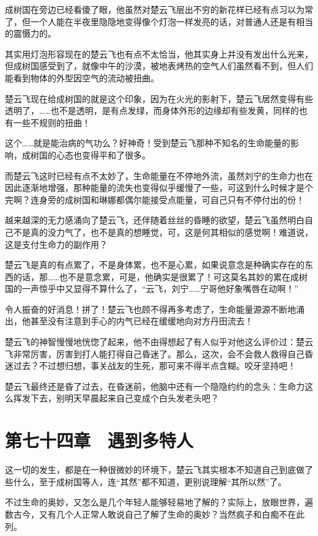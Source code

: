 成树国在旁边已经看傻了眼，他虽然对楚云飞层出不穷的新花样已经有点习以为常了，但一个人能在半夜里隐隐地变得像个灯泡一样发亮的话，对普通人还是有相当的震慑力的。

其实用灯泡形容现在的楚云飞也有点不太恰当，他其实身上并没有发出什么光来，但成树国感受到了，就像中午的沙漠，被地表烤热的空气人们虽然看不到，但人们能看到物体的外型因空气的流动被扭曲。

楚云飞现在给成树国的就是这个印象，因为在火光的影射下，楚云飞居然变得有些透明了，……也不是透明，是有点发绿，而身体外形的边缘却有些发黄，同样的也有一些不规则的扭曲！

这个……就是能治病的气功么？好神奇！受到楚云飞那种不知名的生命能量的影响，成树国的心态也变得平和了很多。

而楚云飞这时已经有点不太妙了，生命能量在不停地外流，虽然刘宁的生命力也在因此逐渐地增强，那种能量的流失也变得似乎缓慢了一些，可这到什么时候才是个完啊？连身旁的成树国和琳娜都偶尔能接受点能量，可自己只有不停付出的份！

越来越深的无力感涌向了楚云飞，还伴随着丝丝的昏睡的欲望，楚云飞虽然明白自己不是真的没力气了，也不是真的想睡觉，可，这是何其相似的感觉啊！难道说，这是支付生命力的副作用？

楚云飞是真的有点累了，不是身体累，也不是心累，如果说意念是种确实存在的东西的话，那……也不是意念累，可是，他确实是很累了！可这莫名其妙的累在成树国的一声惊乎中又显得不算什么了，“云飞，刘宁……宁哥他好象嘴唇在动啊！”

令人振奋的好消息！拼了！楚云飞也顾不得再多考虑了，生命能量源源不断地涌出，他甚至没有注意到手心的内气已经在缓缓地向对方丹田流去！

楚云飞的神智慢慢地恍惚了起来，他不由得想起了有人似乎对他这么评价过：楚云飞非常厉害，厉害到打人能打得自己昏迷了。那么，这次，会不会救人救得自己昏迷过去？不过想归想，事关战友的生死，那可来不得半点含糊。咬牙坚持吧！

楚云飞最终还是昏了过去，在昏迷前，他脑中还有一个隐隐约约的念头：生命力这么挥发下去，别明天早晨起来自己变成个白头发老头吧？

\section{第七十四章　遇到多特人}

这一切的发生，都是在一种很微妙的环境下，楚云飞其实根本不知道自己到底做了些什么，至于成树国等人，连“其然”都不知道，更别说理解“其所以然”了。

不过生命的奥妙，又怎么是几个年轻人能够轻易地了解的？实际上，放眼世界，遍数古今，又有几个人正常人敢说自己了解了生命的奥妙？当然疯子和白痴不在此列。

